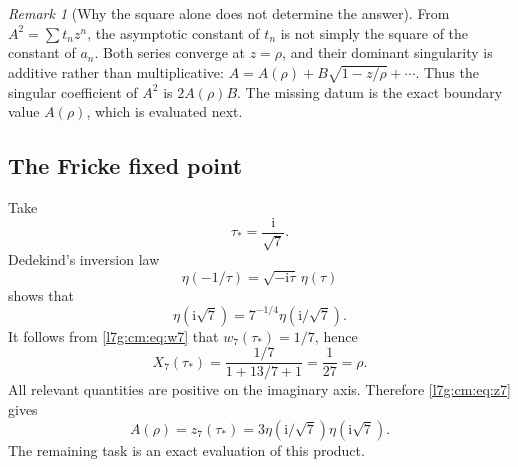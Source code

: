 \documentclass[11pt,letterpaper]{article}
\theoremstyle{remark}\newtheorem{remark}[theorem]{Remark}
\newcommand{\ii}{\mathrm i}\newcommand{\ee}{\mathrm e}
\newcounter{l7gtrsavedeq}
\begin{document}
\begin{remark}[Why the square alone does not determine the answer]
From $A^2=\sum t_nz^n$, the asymptotic constant of $t_n$ is not simply the
square of the constant of $a_n$. Both series converge at $z=\rho$, and
their dominant singularity is additive rather than multiplicative:
$A=A(\rho)+B\sqrt{1-z/\rho}+\cdots$. Thus the singular coefficient of
$A^2$ is $2A(\rho)B$. The missing datum is the exact boundary value
$A(\rho)$, which is evaluated next.
\end{remark}

\subsection{The Fricke fixed point}\label{l7g:cm:sec:CM}
Take
\begin{equation}\label{l7g:cm:eq:taustar}
 \tau_*=\frac{\ii}{\sqrt7}.
\end{equation}
Dedekind's inversion law \cite[Ch.~3]{l7g:apostol}
\begin{equation}\label{l7g:cm:eq:eta-inversion}
 \eta(-1/\tau)=\sqrt{-\ii\tau}\,\eta(\tau)
\end{equation}
shows that
\begin{equation}\label{l7g:cm:eq:eta-inv-special}
 \eta(\ii\sqrt7)=7^{-1/4}\eta(\ii/\sqrt7).
\end{equation}
It follows from \eqref{l7g:cm:eq:w7} that $w_7(\tau_*)=1/7$, hence
\begin{equation}\label{l7g:cm:eq:X-critical}
 X_7(\tau_*)=
 \frac{1/7}{1+13/7+1}=\frac1{27}=\rho.
\end{equation}
All relevant quantities are positive on the imaginary axis. Therefore
\eqref{l7g:cm:eq:z7} gives
\begin{equation}\label{l7g:cm:eq:F-eta-product}
 A(\rho)=z_7(\tau_*)
 =3\eta(\ii/\sqrt7)\eta(\ii\sqrt7).
\end{equation}
The remaining task is an exact evaluation of this product.
\end{document}
